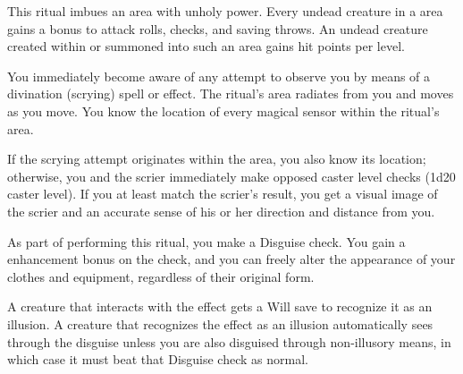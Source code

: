 \spellrng{\rngclose}
\begin{spelleffect}
This ritual imbues an area with unholy power. Every undead creature in a  area gains a  bonus to attack rolls, checks, and saving throws. An undead creature created within or summoned into such an area gains  hit points per level.
\end{spelleffect}

\spelldur{\durext}
\begin{spelleffect}
You immediately become aware of any attempt to observe you by means of a divination (scrying) spell or effect. The ritual's area radiates from you and moves as you move. You know the location of every magical sensor within the ritual's area.
\par If the scrying attempt originates within the area, you also know its location; otherwise, you and the scrier immediately make opposed caster level checks (1d20 \add caster level). If you at least match the scrier's result, you get a visual image of the scrier and an accurate sense of his or her direction and distance from you.
\end{spelleffect}

\spellrng{\rngpers}
\begin{spelleffect}
    As part of performing this ritual, you make a Disguise check. You gain a  enhancement bonus on the check, and you can freely alter the appearance of your clothes and equipment, regardless of their original form.
\end{spelleffect}
\begin{spellnotes}
  A creature that interacts with the effect gets a Will save to recognize it as an illusion. A creature that recognizes the effect as an illusion automatically sees through the disguise unless you are also disguised through non-illusory means, in which case it must beat that Disguise check as normal.
\end{spellnotes}

